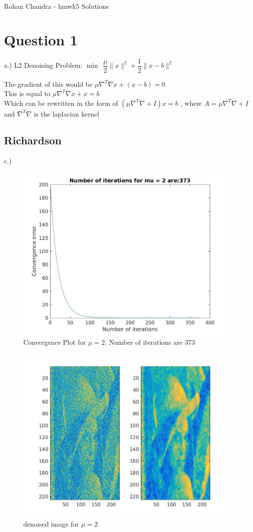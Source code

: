 \documentclass{article}
\begin{document}
\begin{center}{\huge  Rohan Chandra - hmwk5  Solutions}\end{center}

\section*{Question 1}


a.) L2 Denoising Problem: $\min \ \ \dfrac{\mu}{2} \|x\|^2 + \dfrac{1}{2}\|x-b\|^2$


The gradient of this would be $\mu \nabla^T\nabla x + (x-b) =0$ \\

This is equal to $\mu \nabla^T\nabla x +x =b$ \\

Which can be rewritten in the form of $(\mu\nabla^T\nabla + I)x = b$ , where $A = \mu\nabla^T\nabla + I $ and $\nabla^T\nabla$ is the laplacian kernel


\subsection{Richardson}
c.)

\begin{figure}[H]
\centering
\includegraphics[width=0.5\linewidth]{richardson_2}
\caption{Convergence Plot for $\mu = 2$. Number of iterations are 373}
\end{figure}

\begin{figure}[H]
\centering
\includegraphics[width=0.5\linewidth]{richardson_denoised_2.jpg}
\caption{denoised image for $\mu = 2$}
\end{figure}
\end{document}
